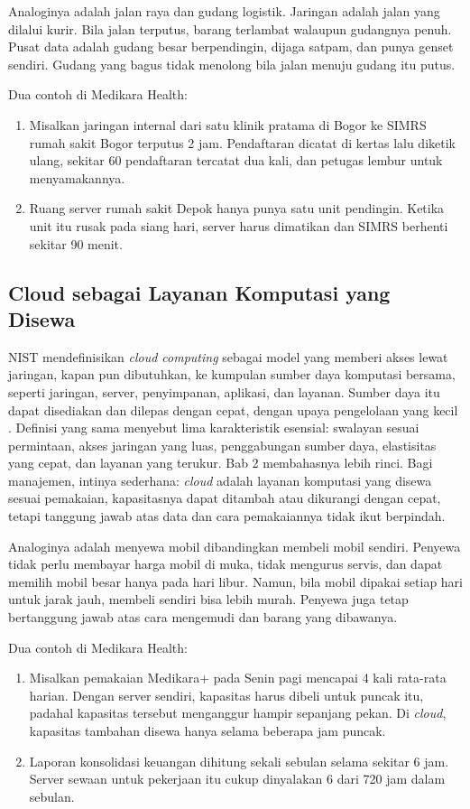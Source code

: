Analoginya adalah jalan raya dan gudang logistik. Jaringan adalah jalan yang dilalui
kurir. Bila jalan terputus, barang terlambat walaupun gudangnya penuh. Pusat data
adalah gudang besar berpendingin, dijaga satpam, dan punya genset sendiri. Gudang yang
bagus tidak menolong bila jalan menuju gudang itu putus.

Dua contoh di Medikara Health:
\begin{enumerate}
  \item Misalkan jaringan internal dari satu klinik pratama di Bogor ke SIMRS rumah
        sakit Bogor terputus 2 jam. Pendaftaran dicatat di kertas lalu diketik ulang,
        sekitar 60 pendaftaran tercatat dua kali, dan petugas lembur untuk menyamakannya.
  \item Ruang server rumah sakit Depok hanya punya satu unit pendingin. Ketika unit itu
        rusak pada siang hari, server harus dimatikan dan SIMRS berhenti sekitar 90
        menit.
\end{enumerate}

\subsection{Cloud sebagai Layanan Komputasi yang Disewa}

NIST mendefinisikan \textit{cloud computing} sebagai model yang memberi akses lewat
jaringan, kapan pun dibutuhkan, ke kumpulan sumber daya komputasi bersama, seperti
jaringan, server, penyimpanan, aplikasi, dan layanan. Sumber daya itu dapat disediakan
dan dilepas dengan cepat, dengan upaya pengelolaan yang kecil \cite{nist800-145}.
Definisi yang sama menyebut lima karakteristik esensial: swalayan sesuai permintaan,
akses jaringan yang luas, penggabungan sumber daya, elastisitas yang cepat, dan layanan
yang terukur. Bab 2 membahasnya lebih rinci. Bagi manajemen, intinya sederhana:
\textit{cloud} adalah layanan komputasi yang disewa sesuai pemakaian, kapasitasnya
dapat ditambah atau dikurangi dengan cepat, tetapi tanggung jawab atas data dan cara
pemakaiannya tidak ikut berpindah.

Analoginya adalah menyewa mobil dibandingkan membeli mobil sendiri. Penyewa tidak perlu
membayar harga mobil di muka, tidak mengurus servis, dan dapat memilih mobil besar
hanya pada hari libur. Namun, bila mobil dipakai setiap hari untuk jarak jauh, membeli
sendiri bisa lebih murah. Penyewa juga tetap bertanggung jawab atas cara mengemudi dan
barang yang dibawanya.

Dua contoh di Medikara Health:
\begin{enumerate}
  \item Misalkan pemakaian Medikara+ pada Senin pagi mencapai 4 kali rata-rata harian.
        Dengan server sendiri, kapasitas harus dibeli untuk puncak itu, padahal
        kapasitas tersebut menganggur hampir sepanjang pekan. Di \textit{cloud},
        kapasitas tambahan disewa hanya selama beberapa jam puncak.
  \item Laporan konsolidasi keuangan dihitung sekali sebulan selama sekitar 6 jam.
        Server sewaan untuk pekerjaan itu cukup dinyalakan 6 dari 720 jam dalam sebulan.
\end{enumerate}


